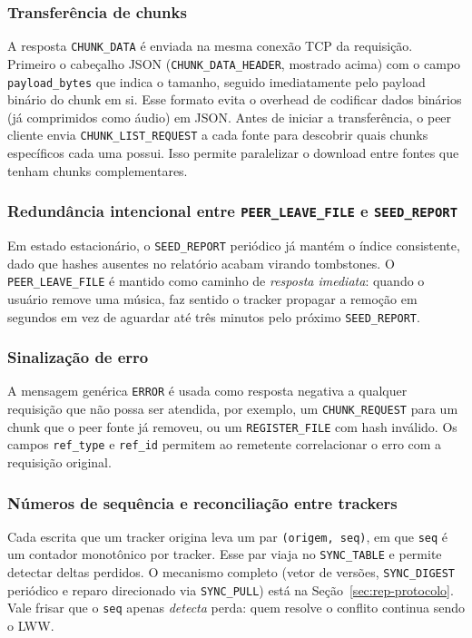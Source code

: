 \documentclass[12pt, a4paper]{article}
\begin{document}
\subsubsection*{Transferência de chunks}
A resposta \texttt{CHUNK\_DATA} é enviada na mesma conexão TCP da requisição. Primeiro o cabeçalho JSON (\texttt{CHUNK\_DATA\_HEADER}, mostrado acima) com o campo \texttt{payload\_bytes} que indica o tamanho, seguido imediatamente pelo payload binário do chunk em si. Esse formato evita o overhead de codificar dados binários (já comprimidos como áudio) em JSON. Antes de iniciar a transferência, o peer cliente envia \texttt{CHUNK\_LIST\_REQUEST} a cada fonte para descobrir quais chunks específicos cada uma possui. Isso permite paralelizar o download entre fontes que tenham chunks complementares.

\subsubsection*{Redundância intencional entre \texttt{PEER\_LEAVE\_FILE} e \texttt{SEED\_REPORT}}
Em estado estacionário, o \texttt{SEED\_REPORT} periódico já mantém o índice consistente, dado que hashes ausentes no relatório acabam virando tombstones. O \texttt{PEER\_LEAVE\_FILE} é mantido como caminho de \textit{resposta imediata}: quando o usuário remove uma música, faz sentido o tracker propagar a remoção em segundos em vez de aguardar até três minutos pelo próximo \texttt{SEED\_REPORT}.

\subsubsection*{Sinalização de erro}
A mensagem genérica \texttt{ERROR} é usada como resposta negativa a qualquer requisição que não possa ser atendida, por exemplo, um \texttt{CHUNK\_REQUEST} para um chunk que o peer fonte já removeu, ou um \texttt{REGISTER\_FILE} com hash inválido. Os campos \texttt{ref\_type} e \texttt{ref\_id} permitem ao remetente correlacionar o erro com a requisição original.

\subsubsection*{Números de sequência e reconciliação entre trackers}
Cada escrita que um tracker origina leva um par \texttt{(origem, seq)}, em que \texttt{seq} é um contador monotônico por tracker. Esse par viaja no \texttt{SYNC\_TABLE} e permite detectar deltas perdidos. O mecanismo completo (vetor de versões, \texttt{SYNC\_DIGEST} periódico e reparo direcionado via \texttt{SYNC\_PULL}) está na Seção~\ref{sec:rep-protocolo}. Vale frisar que o \texttt{seq} apenas \textit{detecta} perda: quem resolve o conflito continua sendo o LWW.
\end{document}
